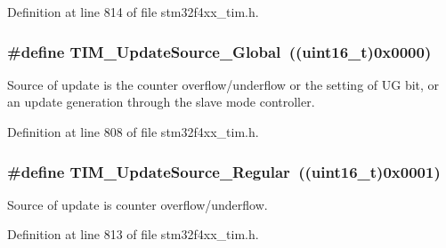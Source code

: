 Definition at line 814 of file stm32f4xx\-\_\-tim.\-h.

\hypertarget{group___t_i_m___update___source_ga32c67bc3f8211a2c7b44ee9fe1523875}{
\subsubsection[{T\-I\-M\-\_\-\-Update\-Source\-\_\-\-Global}]{\setlength{\rightskip}{0pt plus 5cm}\#define T\-I\-M\-\_\-\-Update\-Source\-\_\-\-Global~((uint16\-\_\-t)0x0000)}}\label{group___t_i_m___update___source_ga32c67bc3f8211a2c7b44ee9fe1523875}
Source of update is the counter overflow/underflow or the setting of U\-G bit, or an update generation through the slave mode controller. 

Definition at line 808 of file stm32f4xx\-\_\-tim.\-h.

\hypertarget{group___t_i_m___update___source_ga6f50423cdb011137ae8cd303ccd2080c}{
\subsubsection[{T\-I\-M\-\_\-\-Update\-Source\-\_\-\-Regular}]{\setlength{\rightskip}{0pt plus 5cm}\#define T\-I\-M\-\_\-\-Update\-Source\-\_\-\-Regular~((uint16\-\_\-t)0x0001)}}\label{group___t_i_m___update___source_ga6f50423cdb011137ae8cd303ccd2080c}
Source of update is counter overflow/underflow. 

Definition at line 813 of file stm32f4xx\-\_\-tim.\-h.

